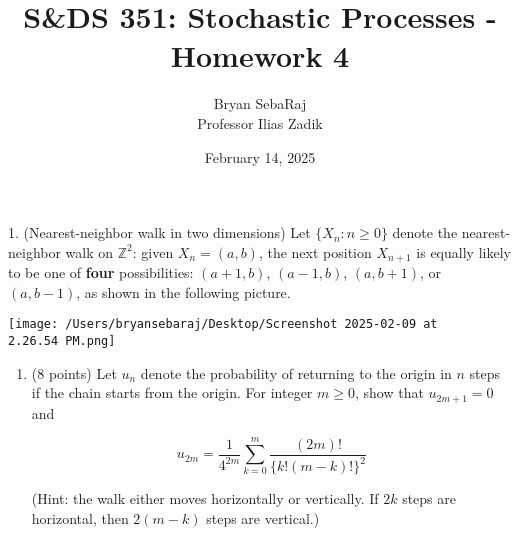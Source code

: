 \documentclass{article}
\title{S\&DS 351: Stochastic Processes - Homework 4}
\author{Bryan SebaRaj \\[0.8em] Professor Ilias Zadik}
\date{February 14, 2025}
\begin{document}
\maketitle

1. (Nearest-neighbor walk in two dimensions)
Let $\{X_n : n \geq 0\}$ denote the nearest-neighbor walk on $\mathbb{Z}^2$: given $X_n = (a,b)$, the next position $X_{n+1}$ is equally likely to be one of \textbf{four} possibilities: $(a+1,b)$, $(a-1,b)$, $(a,b+1)$, or $(a,b-1)$, as shown in the following picture.

\begin{center}
\texttt{[image: /Users/bryansebaraj/Desktop/Screenshot 2025-02-09 at 2.26.54 PM.png]}
\end{center}

\begin{enumerate}[label=(\alph*)]
    \item (8 points) Let $u_n$ denote the probability of returning to the origin in $n$ steps if the chain starts from the origin. For integer $m \geq 0$, show that $u_{2m+1} = 0$ and

\[
u_{2m} = \frac{1}{4^{2m}} \sum_{k=0}^{m} \frac{(2m)!}{\{k!(m-k)!\}^2}
\]

(Hint: the walk either moves horizontally or vertically. If $2k$ steps are horizontal, then $2(m-k)$ steps are vertical.)


\end{enumerate}
\end{document}
